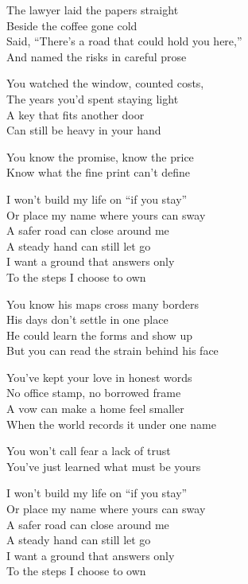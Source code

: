 \begin{lyrics}
The lawyer laid the papers straight\\
Beside the coffee gone cold\\
Said, “There’s a road that could hold you here,”\\
And named the risks in careful prose

You watched the window, counted costs,\\
The years you’d spent staying light\\
A key that fits another door\\
Can still be heavy in your hand

You know the promise, know the price\\
Know what the fine print can’t define

I won’t build my life on “if you stay”\\
Or place my name where yours can sway\\
A safer road can close around me\\
A steady hand can still let go\\
I want a ground that answers only\\
To the steps I choose to own

You know his maps cross many borders\\
His days don’t settle in one place\\
He could learn the forms and show up\\
But you can read the strain behind his face

You’ve kept your love in honest words\\
No office stamp, no borrowed frame\\
A vow can make a home feel smaller\\
When the world records it under one name

You won’t call fear a lack of trust\\
You’ve just learned what must be yours

I won’t build my life on “if you stay”\\
Or place my name where yours can sway\\
A safer road can close around me\\
A steady hand can still let go\\
I want a ground that answers only\\
To the steps I choose to own


\end{lyrics}
